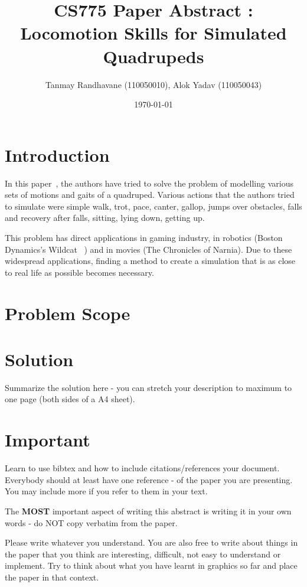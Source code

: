 \documentclass[a4paper,11pt,twocolumn]{article}
\title{CS775 Paper Abstract : Locomotion Skills for Simulated Quadrupeds}
\author{Tanmay Randhavane (110050010), Alok Yadav (110050043)}
\date{\today}
\begin{document}
\maketitle

\section{Introduction}


In this paper~\cite{2011-TOG-quadruped}, the authors have tried to solve the problem of modelling various sets of motions and gaits of a quadruped. Various actions that the authors tried to simulate were simple walk, trot, pace, canter, gallop, jumps over obstacles, falls and recovery after falls, sitting, lying down, getting up.

This problem has direct applications in gaming industry, in robotics (Boston Dynamics's Wildcat ~\cite{Wildcat}) and in movies (The Chronicles of Narnia). Due to these widespread applications, finding a method to create a simulation that is as close to real life as possible becomes necessary.

\section{Problem Scope}

\section{Solution}
Summarize the solution here - you can stretch your description to
maximum to one page (both sides of a A4 sheet).

\section{Important}
Learn to use bibtex and how to include citations/references your
document. Everybody should at least have one reference - of the paper
you are presenting. You may include more if you refer to them in your
text.

The \textbf{MOST} important aspect of writing this abstract is writing
it in your own words - do NOT copy verbatim from the paper. 

Please write whatever you understand. You are also free to write about
things in the paper that you think are interesting, difficult, not
easy to understand or implement. Try to think about what you have
learnt in graphics so far and place the paper in that context. ~\cite{2011-TOG-quadruped}


 
\end{document}
